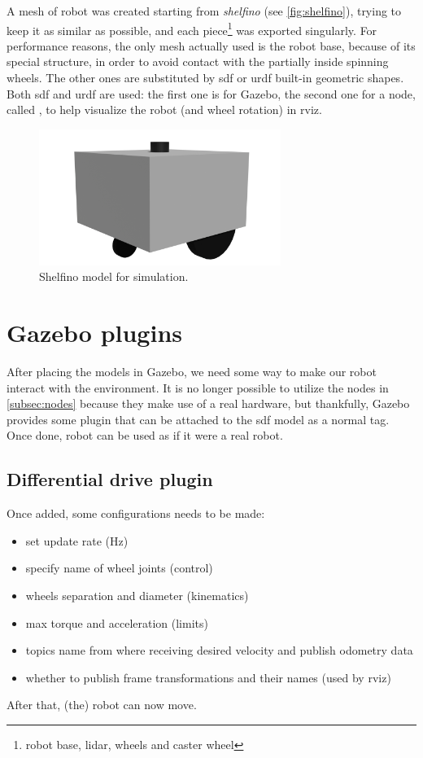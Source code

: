 A mesh of robot was created starting from {\it shelfino} (see \autoref{fig:shelfino}), trying to keep it as similar as possible, and each piece\footnote{robot base, lidar, wheels and caster wheel} was exported singularly. For performance reasons, the only mesh actually used is the robot base, because of its special structure, in order to avoid contact with the partially inside spinning wheels. The other ones are substituted by \Acrshort{sdf} or \Acrfull{urdf} built-in geometric shapes.
Both \Acrshort{sdf} and \Acrshort{urdf} are used: the first one is for Gazebo, the second one for a node, called , to help visualize the robot (and wheel rotation) in \Acrshort{rviz}.

\begin{figure}[h]
    \centering
    \includegraphics[width=0.7\textwidth]{images/shelfino_3d.png}
    \caption{Shelfino model for simulation.}
\end{figure}

\section{Gazebo plugins}

After placing the models in Gazebo, we need some way to make our robot interact with the environment. It is no longer possible to utilize the nodes in \autoref{subsec:nodes} because they make use of a real hardware, but thankfully, Gazebo provides some plugin that can be attached to the \Acrshort{sdf} model as a normal tag. Once done, robot can be used as if it were a real robot.

\subsection*{Differential drive plugin}

Once added, some configurations needs to be made:
\begin{itemize}
    \item set update rate (Hz)
    \item specify name of wheel joints (control)
    \item wheels separation and diameter (kinematics)
    \item max torque and acceleration (limits)
    \item topics name from where receiving desired velocity and publish odometry data
    \item whether to publish frame transformations and their names (used by \Acrshort{rviz})
\end{itemize}
After that, (the) robot can now move.

